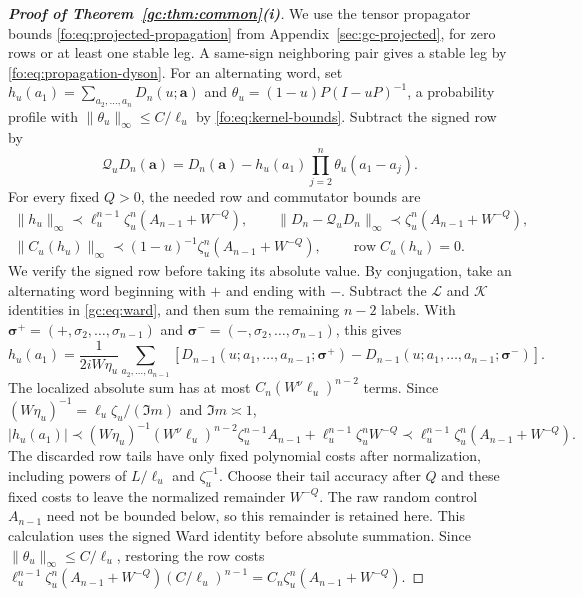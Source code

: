 \documentclass[11pt]{article}
\numberwithin{equation}{section}
\theoremstyle{remark}
\newcommand{\cL}{\mathcal L}
\newcommand{\cK}{\mathcal K}
\newcommand{\cQ}{\mathcal Q}
\begin{document}
\begin{proof}[\textbf{Proof of Theorem~\ref{gc:thm:common}(i)}]
We use the tensor propagator bounds \eqref{fo:eq:projected-propagation}
from Appendix~\ref{sec:gc-projected}, for zero rows or at least one
stable leg. A same-sign neighboring pair gives a stable leg by
\eqref{fo:eq:propagation-dyson}.
For an alternating word, set
$h_u(a_1)=\sum_{a_2,\ldots,a_n}D_n(u;\boldsymbol a)$ and
$\theta_u=(1-u)P(I-uP)^{-1}$, a probability profile with
$\|\theta_u\|_\infty\le C/\ell_u$ by \eqref{fo:eq:kernel-bounds}.
Subtract the signed row by
\[
 \cQ_uD_n(\boldsymbol a)=D_n(\boldsymbol a)
       -h_u(a_1)\prod_{j=2}^n\theta_u(a_1-a_j).
\]
For every fixed $Q>0$, the needed row and commutator bounds are
\begin{equation}\label{fo:eq:ward-projection}
 \begin{gathered}
 \|h_u\|_\infty\prec\ell_u^{n-1}\zeta_u^n(A_{n-1}+W^{-Q}),\qquad
 \|D_n-\cQ_uD_n\|_\infty\prec\zeta_u^n(A_{n-1}+W^{-Q}),\\
 \|C_u(h_u)\|_\infty\prec(1-u)^{-1}\zeta_u^n(A_{n-1}+W^{-Q}),
 \qquad \operatorname{row}C_u(h_u)=0.
 \end{gathered}
\end{equation}
We verify the signed row before taking its absolute value.
By conjugation, take an alternating word beginning with $+$ and ending
with $-$. Subtract the $\cL$ and $\cK$ identities in
\eqref{gc:eq:ward}, and then sum the remaining $n-2$ labels. With
$\boldsymbol\sigma^+=(+,\sigma_2,\ldots,\sigma_{n-1})$ and
$\boldsymbol\sigma^-=(-,\sigma_2,\ldots,\sigma_{n-1})$, this gives
\[
 h_u(a_1)=\frac1{2iW\eta_u}\sum_{a_2,\ldots,a_{n-1}}
 \left[D_{n-1}(u;a_1,\ldots,a_{n-1};\boldsymbol\sigma^+)
       -D_{n-1}(u;a_1,\ldots,a_{n-1};\boldsymbol\sigma^-)\right].
\]
The localized absolute sum has at most
$C_n(W^\nu\ell_u)^{n-2}$ terms. Since
$(W\eta_u)^{-1}=\ell_u\zeta_u/(\Im m)$ and $\Im m\asymp1$,
\begin{equation}\label{gc:eq:row}
 |h_u(a_1)|\prec
 (W\eta_u)^{-1}(W^\nu\ell_u)^{n-2}
        \zeta_u^{n-1}A_{n-1}+\ell_u^{n-1}\zeta_u^nW^{-Q}
 \prec\ell_u^{n-1}\zeta_u^n(A_{n-1}+W^{-Q}).
\end{equation}
The discarded row tails have only fixed polynomial costs after
normalization, including powers of $L/\ell_u$ and $\zeta_u^{-1}$.
Choose their tail accuracy after $Q$ and these fixed costs to leave the
normalized remainder $W^{-Q}$. The raw random control $A_{n-1}$ need
not be bounded below, so this remainder is retained here.
This calculation uses the signed Ward identity before absolute summation.
Since $\|\theta_u\|_\infty\le C/\ell_u$, restoring the row costs
$\ell_u^{n-1}\zeta_u^n(A_{n-1}+W^{-Q})(C/\ell_u)^{n-1}
=C_n\zeta_u^n(A_{n-1}+W^{-Q})$.


\end{proof}
\end{document}
